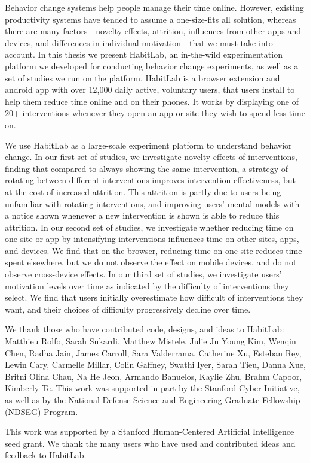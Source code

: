 \beforepreface
{}

Behavior change systems help people manage their time online. However, existing productivity systems have tended to assume a one-size-fits all solution, whereas there are many factors - novelty effects, attrition, influences from other apps and devices, and differences in individual motivation - that we must take into account. In this thesis we present HabitLab, an in-the-wild experimentation platform we developed for conducting behavior change experiments, as well as a set of studies we run on the platform. HabitLab is a browser extension and android app with over 12,000 daily active, voluntary users, that users install to help them reduce time online and on their phones. It works by displaying one of 20+ interventions whenever they open an app or site they wish to spend less time on.

We use HabitLab as a large-scale experiment platform to understand behavior change. In our first set of studies, we investigate novelty effects of interventions, finding that compared to always showing the same intervention, a strategy of rotating between different interventions improves intervention effectiveness, but at the cost of increased attrition. This attrition is partly due to users being unfamiliar with rotating interventions, and improving users' mental models with a notice shown whenever a new intervention is shown is able to reduce this attrition. In our second set of studies, we investigate whether reducing time on one site or app by intensifying interventions influences time on other sites, apps, and devices. We find that on the browser, reducing time on one site reduces time spent elsewhere, but we do not observe the effect on mobile devices, and do not observe cross-device effects. In our third set of studies, we investigate users' motivation levels over time as indicated by the difficulty of interventions they select. We find that users initially overestimate how difficult of interventions they want, and their choices of difficulty progressively decline over time.


We thank those who have contributed code, designs, and ideas to HabitLab: Matthieu Rolfo, Sarah Sukardi, Matthew Mistele, Julie Ju Young Kim, Wenqin Chen, Radha Jain, James Carroll, Sara Valderrama, Catherine Xu, Esteban Rey, Lewin Cary, Carmelle Millar, Colin Gaffney, Swathi Iyer, Sarah Tieu, Danna Xue, Britni Olina Chau, Na He Jeon, Armando Banuelos, Kaylie Zhu, Brahm Capoor, Kimberly Te. This work was supported in part by the Stanford Cyber Initiative, as well as by the National Defense Science and Engineering Graduate Fellowship (NDSEG) Program.


This work was supported by a Stanford Human-Centered Artificial Intelligence seed grant. We thank the many users who have used and contributed ideas and feedback to HabitLab.
\afterpreface